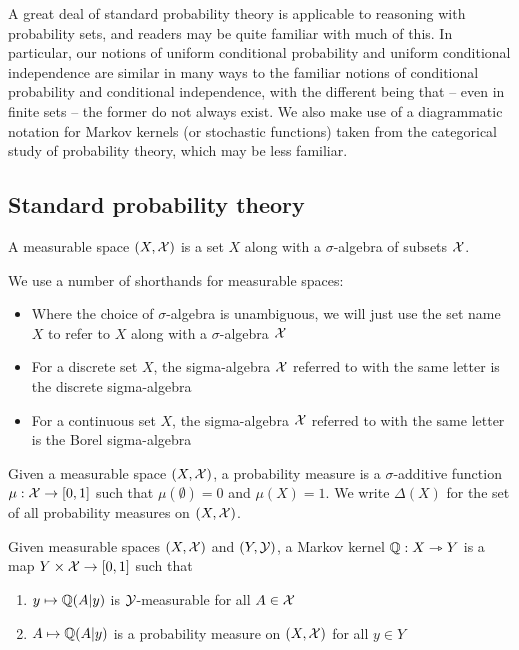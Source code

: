 A great deal of standard probability theory is applicable to reasoning with probability sets, and readers may be quite familiar with much of this. In particular, our notions of uniform conditional probability and uniform conditional independence are similar in many ways to the familiar notions of conditional probability and conditional independence, with the different being that -- even in finite sets -- the former do not always exist. We also make use of a diagrammatic notation for Markov kernels (or stochastic functions) taken from the categorical study of probability theory, which may be less familiar.

\subsection{Standard probability theory}

\begin{definition}
A measurable space $(X,\mathcal{X})$ is a set $X$ along with a $\sigma$-algebra of subsets $\mathcal{X}$.
\end{definition}

We use a number of shorthands for measurable spaces:
\begin{itemize}
	\item Where the choice of $\sigma$-algebra is unambiguous, we will just use the set name $X$ to refer to $X$ along with a $\sigma$-algebra $\mathcal{X}$
	\item For a discrete set $X$, the sigma-algebra $\mathcal{X}$ referred to with the same letter is the discrete sigma-algebra
	\item For a continuous set $X$, the sigma-algebra $\mathcal{X}$ referred to with the same letter is the Borel sigma-algebra
\end{itemize}

\begin{definition}
Given a measurable space $(X,\mathcal{X})$, a probability measure is a $\sigma$-additive function $\mu:\mathcal{X}\to [0,1]$ such that $\mu(\emptyset)=0$ and $\mu(X)=1$. We write $\Delta(X)$ for the set of all probability measures on $(X,\mathcal{X})$.
\end{definition}

\begin{definition}
Given measurable spaces $(X,\mathcal{X})$ and $(Y,\mathcal{Y})$, a Markov kernel $\mathbb{Q}:X\rightarrowtriangle Y$ is a map $Y\times \mathcal{X}\to [0,1]$ such that
\begin{enumerate}
	\item $y\mapsto \mathbb{Q}(A|y)$ is $\mathcal{Y}$-measurable for all $A\in \mathcal{X}$
	\item $A\mapsto \mathbb{Q}(A|y)$ is a probability measure on $(X,\mathcal{X})$ for all $y\in Y$
\end{enumerate}
\end{definition}

